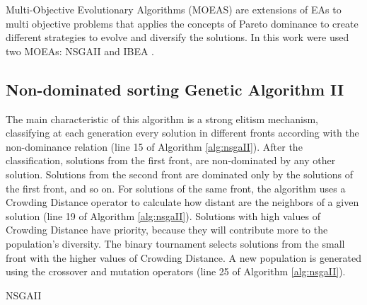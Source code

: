 Multi-Objective Evolutionary Algorithms (MOEAS) are extensions of EAs to multi objective problems that applies the concepts of Pareto dominance to create different strategies to evolve and diversify the solutions. In this work were used two MOEAs: NSGAII \cite{deb2002fast} and IBEA \cite{zitzler2004indicator}.


\subsection{Non-dominated sorting Genetic Algorithm II}


The main characteristic of this algorithm is a strong elitism mechanism, classifying at each generation every solution in different fronts according with the non-dominance relation (line 15 of Algorithm \ref{alg:nsgaII}). After the classification, solutions from the first front, are non-dominated by any other solution. Solutions from the second front are dominated only by the solutions of the first front, and so on. For solutions of the same front, the algorithm uses a Crowding Distance operator to calculate how distant are the neighbors of a given solution (line 19 of Algorithm \ref{alg:nsgaII}). Solutions with high values of Crowding Distance have priority, because they will contribute more to the population's diversity. The binary tournament selects solutions from the small front with the higher values of Crowding Distance. A new population is generated using the crossover and mutation operators (line 25 of Algorithm \ref{alg:nsgaII}).


\begin{algorithm}[htb!]
	\begin{algorithmic}[1]
		\EndWhile
			\EndWhile
			
		\EndWhile
	\end{algorithmic}
	\caption{NSGAII}
	\label{alg:nsgaII}
\end{algorithm}


